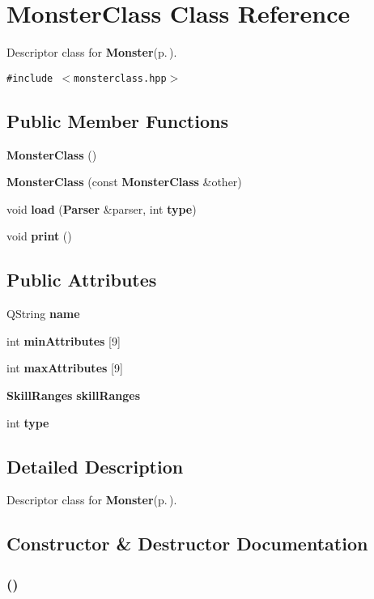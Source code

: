 \section{Monster\-Class Class Reference}
\label{classMonsterClass}
Descriptor class for {\bf Monster}{\rm (p.\,\pageref{classMonster})}.  


{\tt \#include $<$monsterclass.hpp$>$}

\subsection*{Public Member Functions}
\begin{CompactItemize}
\item 
{\bf Monster\-Class} ()
\item 
{\bf Monster\-Class} (const {\bf Monster\-Class} \&other)
\item 
void {\bf load} ({\bf Parser} \&parser, int {\bf type})
\item 
void {\bf print} ()
\end{CompactItemize}
\subsection*{Public Attributes}
\begin{CompactItemize}
\item 
QString {\bf name}
\item 
int {\bf min\-Attributes} [9]
\item 
int {\bf max\-Attributes} [9]
\item 
{\bf Skill\-Ranges} {\bf skill\-Ranges}
\item 
int {\bf type}
\end{CompactItemize}


\subsection{Detailed Description}
Descriptor class for {\bf Monster}{\rm (p.\,\pageref{classMonster})}. 



\subsection{Constructor \& Destructor Documentation}
\subsubsection{ ()}\label{classMonsterClass_a0}


